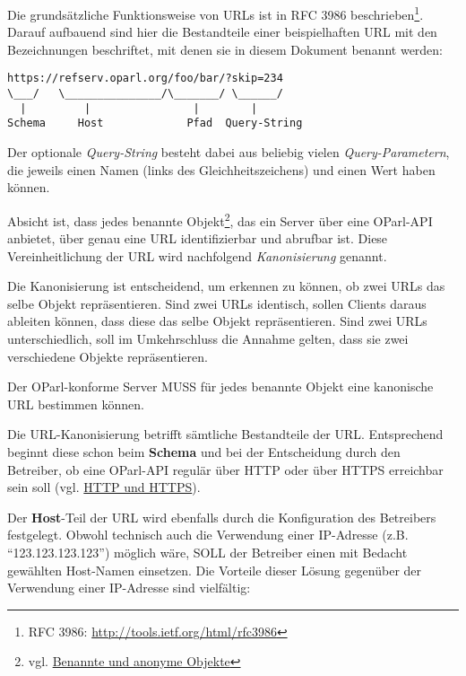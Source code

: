 \documentclass[,a4paper]{article}
\begin{document}
Die grundsätzliche Funktionsweise von URLs ist in RFC 3986
beschrieben\footnote{RFC 3986: \url{http://tools.ietf.org/html/rfc3986}}.
Darauf aufbauend sind hier die Bestandteile einer beispielhaften URL mit
den Bezeichnungen beschriftet, mit denen sie in diesem Dokument benannt
werden:

\begin{verbatim}
https://refserv.oparl.org/foo/bar/?skip=234
\___/   \_______________/\_______/ \______/
  |         |                |        |
Schema     Host             Pfad  Query-String
\end{verbatim}

Der optionale \emph{Query-String} besteht dabei aus beliebig vielen
\emph{Query-Parametern}, die jeweils einen Namen (links des
Gleichheitszeichens) und einen Wert haben können.


Absicht ist, dass jedes benannte Objekt\footnote{vgl.
  \hyperref[benannteux5fanonymeux5fobjekte]{Benannte und anonyme
  Objekte}}, das ein Server über eine OParl-API anbietet, über genau
eine URL identifizierbar und abrufbar ist. Diese Vereinheitlichung der
URL wird nachfolgend \emph{Kanonisierung} genannt.

Die Kanonisierung ist entscheidend, um erkennen zu können, ob zwei URLs
das selbe Objekt repräsentieren. Sind zwei URLs identisch, sollen
Clients daraus ableiten können, dass diese das selbe Objekt
repräsentieren. Sind zwei URLs unterschiedlich, soll im Umkehrschluss
die Annahme gelten, dass sie zwei verschiedene Objekte repräsentieren.

Der OParl-konforme Server MUSS für jedes benannte Objekt eine kanonische
URL bestimmen können.

Die URL-Kanonisierung betrifft sämtliche Bestandteile der URL.
Entsprechend beginnt diese schon beim \textbf{Schema} und bei der
Entscheidung durch den Betreiber, ob eine OParl-API regulär über HTTP
oder über HTTPS erreichbar sein soll (vgl.
\hyperref[http-und-https]{HTTP und HTTPS}).

Der \textbf{Host}-Teil der URL wird ebenfalls durch die Konfiguration
des Betreibers festgelegt. Obwohl technisch auch die Verwendung einer
IP-Adresse (z.B. ``123.123.123.123'') möglich wäre, SOLL der Betreiber
einen mit Bedacht gewählten Host-Namen einsetzen. Die Vorteile dieser
Lösung gegenüber der Verwendung einer IP-Adresse sind vielfältig:
\end{document}
